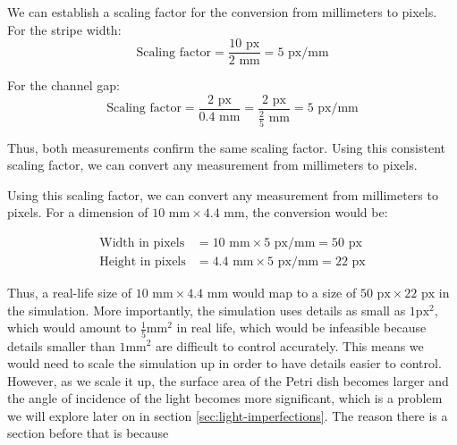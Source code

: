 We can establish a scaling factor for the conversion from millimeters to pixels.
For the stripe width:
\[ \text{Scaling factor} = \frac{10 \text{ px}}{2 \text{ mm}} = 5 \text{ px/mm} \]

For the channel gap:
\[ \text{Scaling factor} = \frac{2 \text{ px}}{0.4 \text{ mm}} = \frac{2 \text{ px}}{\frac{2}{5} \text{ mm}} = 5 \text{ px/mm} \]

Thus, both measurements confirm the same scaling factor. Using this consistent scaling factor, we can convert any measurement from millimeters to pixels.

Using this scaling factor, we can convert any measurement from millimeters to pixels.
For a dimension of \(10 \text{ mm} \times 4.4 \text{ mm}\), the conversion would be:

\begin{align*}
\text{Width in pixels} &= 10 \text{ mm} \times 5 \text{ px/mm} = 50 \text{ px} \\
\text{Height in pixels} &= 4.4 \text{ mm} \times 5 \text{ px/mm} = 22 \text{ px}
\end{align*}

Thus, a real-life size of \(10 \text{ mm} \times 4.4 \text{ mm}\) would map to a size of \(50 \text{ px} \times 22 \text{ px}\) in the simulation.
More importantly, the simulation uses details as small as $1\text{px}^2$, which would amount to $\frac{1}{5}\text{mm}^2$ in real life, which would be infeasible because details smaller than $1\text{mm}^2$ are difficult to control accurately.
This means we would need to scale the simulation up in order to have details easier to control. 
However, as we scale it up, the surface area of the Petri dish becomes larger and the angle of incidence of the light becomes more significant, which is a problem we will explore later on in section \ref{sec:light-imperfections}.
The reason there is a section before that is because 


